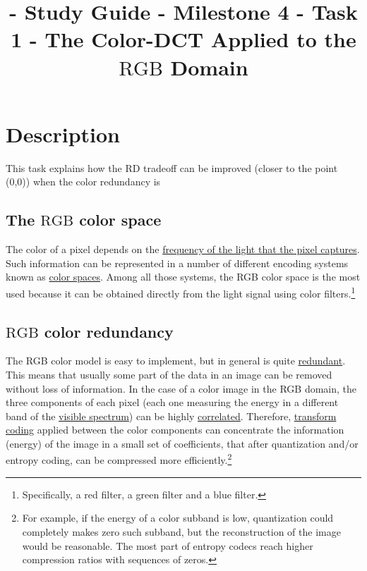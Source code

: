 

\title{\SM{} - Study Guide - Milestone 4 - Task 1 - The Color-DCT Applied to the $\text{RGB}$ Domain}

\maketitle

\tableofcontents

\section{Description}

This task explains how the RD tradeoff can be improved (closer to the point (0,0)) when the color redundancy is 

\subsection{The $\text{RGB}$ color space}

The color of a pixel depends on the
\href{https://en.wikipedia.org/wiki/Visible_spectrum}{frequency of the
  light that the pixel captures}. Such information can be represented
in a number of different encoding systems known as
\href{https://en.wikipedia.org/wiki/Color_space}{color spaces}. Among
all those systems, the RGB color space is the most used because it can
be obtained directly from the light signal using color
filters.\footnote{Specifically, a red filter, a green filter and a
blue filter.}


\subsection{$\text{RGB}$ color redundancy}

The RGB color model is easy to implement, but in general is
quite
\href{https://en.wikipedia.org/wiki/Data_redundancy}{redundant}. This
means that usually some part of the data in an image can be removed
without loss of information. In the case of a color image in the RGB
domain, the three components of each pixel (each one measuring the
energy in a different band of the
\href{https://en.wikipedia.org/wiki/Visible_spectrum}{visible
  spectrum}) can be highly
\href{https://en.wikipedia.org/wiki/Correlation_and_dependence}{correlated}. Therefore,
\href{https://vicente-gonzalez-ruiz.github.io/transform_coding/}{transform
  coding} applied between the color components can concentrate the
information (energy) of the image in a small set of coefficients, that
after quantization and/or entropy coding, can be compressed more
efficiently.\footnote{For example, if the energy of a color subband is
low, quantization could completely makes zero such subband, but the
reconstruction of the image would be reasonable. The most part of
entropy codecs reach higher compression ratios with sequences of
zeros.}

